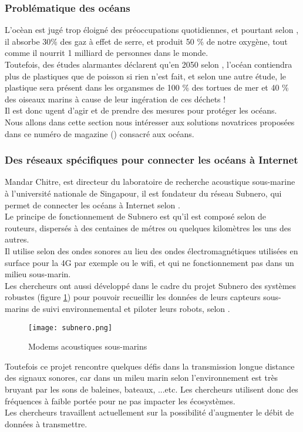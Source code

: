 \documentclass[a4paper,12pt]{report}
\begin{document}
\subsubsection*{Problématique des océans}
L'ocèan est jugé trop éloigné des préoccupations quotidiennes, et pourtant selon \cite{ref25}, il absorbe 30\% des gaz à effet de serre, et produit 50 \% de notre oxygène, tout comme il nourrit 1 milliard de personnes dans le monde.\\ Toutefois, des études alarmantes déclarent qu'en 2050 selon \cite{ref25}, l'océan contiendra plus de plastiques que de poisson si rien n'est fait, et selon une autre étude, le plastique sera présent dans les organsmes de 100 \% des tortues de mer et 40 \% des oiseaux marins à cause de leur ingération de ces déchets !\\
Il est donc ugent d'agir et de prendre des mesures pour protéger les océans.\\
Nous allons dans cette section nous intéresser aux solutions novatrices proposées dans ce numéro de magazine (\cite{ref25}) consacré aux océans.
\subsubsection*{Des réseaux spécifiques pour connecter les océans à Internet}
Mandar Chitre, est directeur du laboratoire de recherche acoustique sous-marine à l'université nationale de Singapour, il est fondateur du réseau Subnero, qui permet de connecter les océans à Internet selon \cite{ref25}.\\
Le principe de fonctionnement de Subnero est qu'il est composé selon \cite{ref25} de routeurs, dispersés à des centaines de métres ou quelques kilomètres les uns des autres.\\
Il utilise selon \cite{ref25} des ondes sonores au lieu des ondes électromagnétiques utilisées en surface pour la 4G par exemple ou le wifi, et qui ne fonctionnement pas dans un milieu sous-marin.\\
Les chercheurs ont aussi développé dans le cadre du projet Subnero des systèmes robustes (figure \ref{subnero}) pour pouvoir recueillir les données de leurs capteurs sous-marins de suivi environnemental et piloter leurs robots, selon \cite{ref25}.\\

\begin {figure}[H]
\begin{center} \texttt{[image: subnero.png]}
\caption{Modems acoustiques sous-marins \cite{ref26}}
\label{subnero}
\end{center}
\end{figure}
Toutefois ce projet rencontre quelques défis dans la transmission longue distance des signaux sonores, car dans un mileu marin selon \cite{ref25} l'environnement est très bruyant par les sons de baleines, bateaux, ...etc. Les chercheurs utilisent donc des fréquences à faible portée pour ne pas impacter les écosystèmes.\\
Les chercheurs travaillent actuellement sur la possibilité d'augmenter le débit de données à transmettre.
\end{document}
